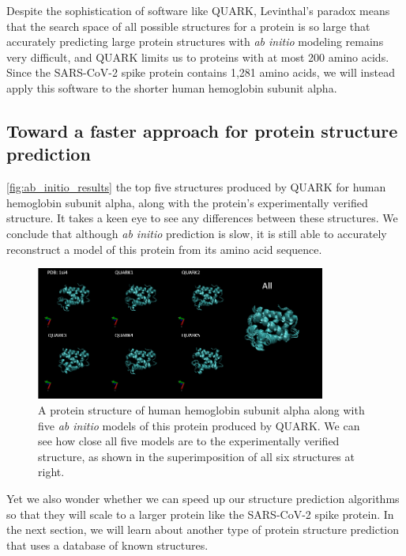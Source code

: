 Despite the sophistication of software like QUARK, Levinthal's paradox means that the search space of all possible structures for a protein is so large that accurately predicting large protein structures with \textit{ab initio} modeling remains very difficult, and QUARK limits us to proteins with at most 200 amino acids. Since the SARS-CoV-2 spike protein contains 1,281 amino acids, we will instead apply this software to the shorter human hemoglobin subunit alpha. 

\FloatBarrier
{}
\subsection{Toward a faster approach for protein structure prediction}

\autoref{fig:ab_initio_results} the top five structures produced by QUARK for human hemoglobin subunit alpha, along with the protein's experimentally verified structure. It takes a keen eye to see any differences between these structures. We conclude that although \textit{ab initio} prediction is slow, it is still able to accurately reconstruct a model of this protein from its amino acid sequence.\\

\begin{figure}[h]
	\centering
	\mySfFamily
	\includegraphics[width = 0.85\textwidth]{../images/ab_initio_results.png}
	\caption{A protein structure of human hemoglobin subunit alpha along with five \textit{ab initio} models of this protein produced by QUARK. We can see how close all five models are to the experimentally verified structure, as shown in the superimposition of all six structures at right.}
	\label{fig:ab_initio_results}
\end{figure}

Yet we also wonder whether we can speed up our structure prediction algorithms so that they will scale to a larger protein like the SARS-CoV-2 spike protein. In the next section, we will learn about another type of protein structure prediction that uses a database of known structures.\\

